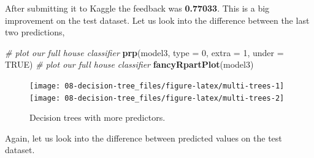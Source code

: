 \documentclass[
]{book}
\newenvironment{Shaded}{\begin{snugshade}}{\end{snugshade}}
\newcommand{\CommentTok}[1]{\textcolor[rgb]{0.56,0.35,0.01}{\textit{#1}}}
\newcommand{\DataTypeTok}[1]{\textcolor[rgb]{0.13,0.29,0.53}{#1}}
\newcommand{\DecValTok}[1]{\textcolor[rgb]{0.00,0.00,0.81}{#1}}
\newcommand{\KeywordTok}[1]{\textcolor[rgb]{0.13,0.29,0.53}{\textbf{#1}}}
\newcommand{\NormalTok}[1]{#1}
\newcommand{\OperatorTok}[1]{\textcolor[rgb]{0.81,0.36,0.00}{\textbf{#1}}}
\newcommand{\OtherTok}[1]{\textcolor[rgb]{0.56,0.35,0.01}{#1}}
\newcommand{\StringTok}[1]{\textcolor[rgb]{0.31,0.60,0.02}{#1}}
\begin{document}
\begin{Shaded}
\end{Shaded}

After submitting it to Kaggle the feedback was \textbf{0.77033}. This is a big improvement on the test dataset. Let us look into the difference between the last two predictions,

\begin{Shaded}
\begin{Highlighting}[]
\CommentTok{# plot our full house classifier }
\KeywordTok{prp}\NormalTok{(model3, }\DataTypeTok{type =} \DecValTok{0}\NormalTok{, }\DataTypeTok{extra =} \DecValTok{1}\NormalTok{, }\DataTypeTok{under =} \OtherTok{TRUE}\NormalTok{)}
\CommentTok{# plot our full house classifier }
\KeywordTok{fancyRpartPlot}\NormalTok{(model3)}
\end{Highlighting}
\end{Shaded}

\begin{figure}

{\centering \texttt{[image: 08-decision-tree\_files/figure-latex/multi-trees-1]} \texttt{[image: 08-decision-tree\_files/figure-latex/multi-trees-2]} 

}

\caption{Decision trees with more predictors.}\label{fig:multi-trees}
\end{figure}

Again, let us look into the difference between predicted values on the test dataset.

\begin{Shaded}
\end{Shaded}
\end{document}
